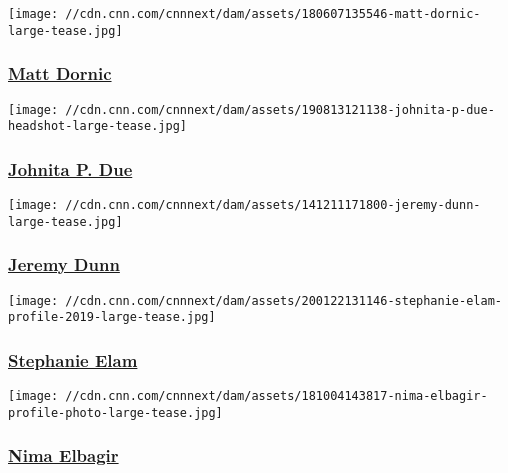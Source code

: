 \href{/profiles/matt-dornic}{}

\texttt{[image: //cdn.cnn.com/cnnnext/dam/assets/180607135546-matt-dornic-large-tease.jpg]}

\hypertarget{matt-dornic}{%
\subsubsection{\texorpdfstring{\href{/profiles/matt-dornic}{Matt
Dornic}}{Matt Dornic}}\label{matt-dornic}}

\href{/profiles/johnita-p-due}{}

\texttt{[image: //cdn.cnn.com/cnnnext/dam/assets/190813121138-johnita-p-due-headshot-large-tease.jpg]}

\hypertarget{johnita-p-due-}{%
\subsubsection{\texorpdfstring{\href{/profiles/johnita-p-due}{Johnita P.
Due }}{Johnita P. Due }}\label{johnita-p-due-}}

\href{/profiles/jeremy-dunn}{}

\texttt{[image: //cdn.cnn.com/cnnnext/dam/assets/141211171800-jeremy-dunn-large-tease.jpg]}

\hypertarget{jeremy-dunn}{%
\subsubsection{\texorpdfstring{\href{/profiles/jeremy-dunn}{Jeremy
Dunn}}{Jeremy Dunn}}\label{jeremy-dunn}}

\href{/profiles/stephanie-elam-profile}{}

\texttt{[image: //cdn.cnn.com/cnnnext/dam/assets/200122131146-stephanie-elam-profile-2019-large-tease.jpg]}

\hypertarget{stephanie-elam}{%
\subsubsection{\texorpdfstring{\href{/profiles/stephanie-elam-profile}{Stephanie
Elam}}{Stephanie Elam}}\label{stephanie-elam}}

\href{/profiles/nima-elbagir}{}

\texttt{[image: //cdn.cnn.com/cnnnext/dam/assets/181004143817-nima-elbagir-profile-photo-large-tease.jpg]}

\hypertarget{nima-elbagir}{%
\subsubsection{\texorpdfstring{\href{/profiles/nima-elbagir}{Nima
Elbagir}}{Nima Elbagir}}\label{nima-elbagir}}

